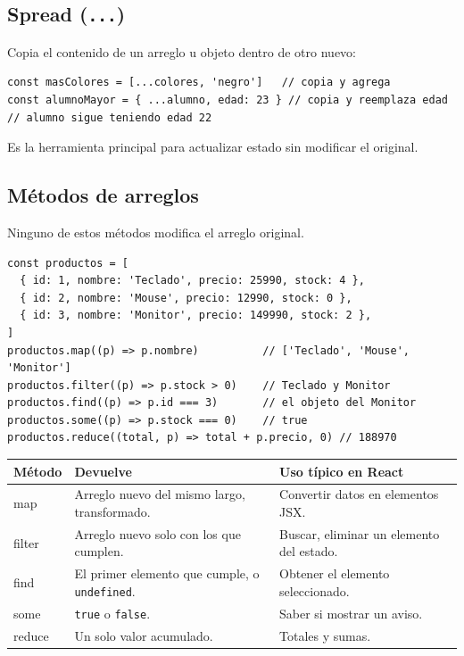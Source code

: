 \documentclass[11pt,a4paper]{article}
\newcommand{\cmd}[1]{\texttt{\color{reactdark}#1}}
\begin{document}
\subsection{Spread (\texttt{...})}

Copia el contenido de un arreglo u objeto dentro de otro nuevo:
\begin{lstlisting}[language=JSX]
const masColores = [...colores, 'negro']   // copia y agrega
const alumnoMayor = { ...alumno, edad: 23 } // copia y reemplaza edad
// alumno sigue teniendo edad 22
\end{lstlisting}

Es la herramienta principal para actualizar estado sin modificar el original.

\subsection{Métodos de arreglos}

Ninguno de estos métodos modifica el arreglo original.

\begin{lstlisting}[language=JSX]
const productos = [
  { id: 1, nombre: 'Teclado', precio: 25990, stock: 4 },
  { id: 2, nombre: 'Mouse', precio: 12990, stock: 0 },
  { id: 3, nombre: 'Monitor', precio: 149990, stock: 2 },
]
productos.map((p) => p.nombre)          // ['Teclado', 'Mouse', 'Monitor']
productos.filter((p) => p.stock > 0)    // Teclado y Monitor
productos.find((p) => p.id === 3)       // el objeto del Monitor
productos.some((p) => p.stock === 0)    // true
productos.reduce((total, p) => total + p.precio, 0) // 188970
\end{lstlisting}

\begin{center}
\small
\begin{tabular}{>{\ttfamily}l p{5.3cm} p{5.3cm}}
\toprule
\textrm{\textbf{Método}} & \textbf{Devuelve} & \textbf{Uso típico en React} \\
\midrule
map & Arreglo nuevo del mismo largo, transformado. & Convertir datos en elementos JSX. \\
filter & Arreglo nuevo solo con los que cumplen. & Buscar, eliminar un elemento del estado. \\
find & El primer elemento que cumple, o \cmd{undefined}. & Obtener el elemento seleccionado. \\
some & \cmd{true} o \cmd{false}. & Saber si mostrar un aviso. \\
reduce & Un solo valor acumulado. & Totales y sumas. \\
\bottomrule
\end{tabular}
\end{center}
\end{document}
